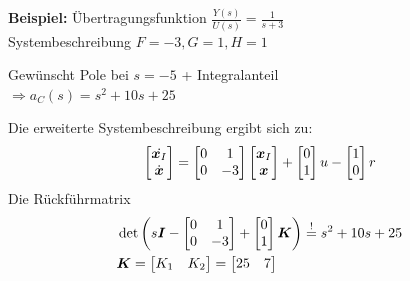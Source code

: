 \begin{tcolorbox}[colback=white!10!white,colframe=green!30!black,title=Integralregelung]
\begin{figure}[H]
\end{figure}
\tcblower
\textbf{Beispiel:}
Übertragungsfunktion $\frac{Y(s)}{U(s)} = \frac{1}{s+3}$\\
Systembeschreibung $F = -3, G = 1, H = 1$

Gewünscht Pole bei $s=-5$ + Integralanteil \\$\Rightarrow a_C(s) = s^2+10s+25$

Die erweiterte Systembeschreibung ergibt sich zu:
\begin{align*}
        \begin{bmatrix}
        \dot{    \boldsymbol{x}_I} \\ \dot{    \boldsymbol{x}}
        \end{bmatrix} = \begin{bmatrix}
            0 & 1\\ 0 & -3
        \end{bmatrix} \begin{bmatrix}
        \boldsymbol{x}_I \\\boldsymbol{x}
        \end{bmatrix} + \begin{bmatrix}
        0 \\1
        \end{bmatrix}u - \begin{bmatrix}
        1\\0
        \end{bmatrix}r
\end{align*}
Die Rückführmatrix 
\begin{align*}
    &\det\left( s\boldsymbol{I} - \begin{bmatrix}
    0 & 1\\ 0 & -3
    \end{bmatrix}+ \begin{bmatrix}
    0 \\1
    \end{bmatrix}\boldsymbol{K}\right) \overset{!}{=} s^2 +10s +25\\
    &\boldsymbol{K} = \begin{bmatrix}
        K_1 & K_2
    \end{bmatrix} = \begin{bmatrix}
    25 & 7
    \end{bmatrix}
\end{align*}
\end{tcolorbox}
